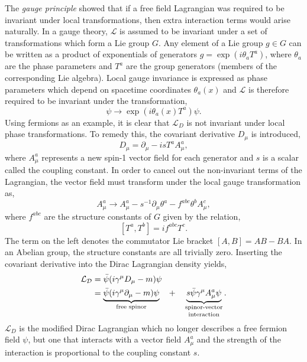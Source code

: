 The \textit{gauge principle} showed that if a free field Lagrangian was required to be invariant under local transformations, then extra interaction terms would arise naturally.
In a gauge theory, $\mathcal{L}$ is assumed to be invariant under a set of transformations which form a Lie group $G$.
Any element of a Lie group $g \in G$ can be written as a product of exponentials of generators $g = \exp(i \theta_a T^a)$, where $\theta_a$ are the phase parameters and $T^a$ are the group generators (members of the corresponding Lie algebra).
Local gauge invariance is expressed as phase parameters which depend on spacetime coordinates $\theta_a(x)$ and $\mathcal{L}$ is therefore required to be invariant under the transformation,
\begin{equation}
    \label{eq:local_gauge_invariance}
    \psi \rightarrow \exp\left(i \theta_a(x) T^a\right) \psi.
\end{equation}
Using fermions as an example, it is clear that $\mathcal{L}_D$ is not invariant under local phase transformations.
To remedy this, the covariant derivative $D_\mu$ is introduced,
\begin{equation}
    \label{eq:covariant_derivative}
    D_\mu = \partial_\mu - i s T^a A_\mu^a,
\end{equation}
where $A_\mu^a$ represents a new spin-1 vector field for each generator and $s$ is a scalar called the coupling constant.
In order to cancel out the non-invariant terms of the Lagrangian, the vector field must transform under the local gauge transformation as,
\begin{equation}
    \label{eq:gauge_transformation}
    A_\mu^a \rightarrow A_\mu^a - s^{-1} \partial_\mu \theta^a - f^{abc} \theta^b A_\mu^c,
\end{equation}
where $f^{abc}$ are the structure constants of $G$ given by the relation,
\begin{equation}
    \label{eq:structure_constants}
    [T^a, T^b] = i f^{abc} T^c.
\end{equation}
The term on the left denotes the commutator Lie bracket $[A, B] = AB - BA$.
In an Abelian group, the structure constants are all trivially zero.
Inserting the covariant derivative into the Dirac Lagrangian density yields,
\begin{align}
    \label{eq:dirac_lagrangian_gauge}
    \mathcal{L_D} & = \bar \psi (i \gamma^\mu D_\mu - m) \psi                                                                                                                                       \\
                  & = \underbrace{\bar \psi (i \gamma^\mu \partial_\mu - m) \psi}_\text{free spinor} \quad + \quad \underbrace{s \bar \psi \gamma^\mu A_\mu^a \psi}_\text{\shortstack{spinor-vector \\interaction}}.
\end{align}
$\mathcal{L}_D$ is the modified Dirac Lagrangian which no longer describes a free fermion field $\psi$, but one that interacts with a vector field $A_\mu^a$ and the strength of the interaction is proportional to the coupling constant $s$.

